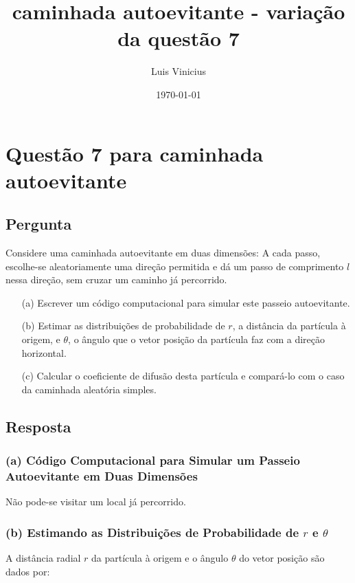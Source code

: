 \documentclass[a4paper,12pt]{article}
\title{caminhada autoevitante - variação da questão 7}
\author{Luis Vinicius}
\date{\today}
\begin{document}
\maketitle

\section{Questão 7 para caminhada autoevitante}

\subsection{Pergunta}

Considere uma caminhada autoevitante em duas dimensões: A cada passo, escolhe-se aleatoriamente uma direção permitida e dá um passo de comprimento \( l \) nessa direção, sem cruzar um caminho já percorrido.

\begin{itemize}
    \item[(a)] Escrever um código computacional para simular este passeio autoevitante.
    \item[(b)] Estimar as distribuições de probabilidade de \( r \), a distância da partícula à origem, e \( \theta \), o ângulo que o vetor posição da partícula faz com a direção horizontal.
    \item[(c)] Calcular o coeficiente de difusão desta partícula e compará-lo com o caso da caminhada aleatória simples.
\end{itemize}

\subsection{Resposta}

\subsubsection{(a) Código Computacional para Simular um Passeio Autoevitante em Duas Dimensões}

Não pode-se visitar um local já percorrido.
\subsubsection{(b) Estimando as Distribuições de Probabilidade de \( r \) e \( \theta \)}

A distância radial \( r \) da partícula à origem e o ângulo \( \theta \) do vetor posição são dados por:
\end{document}
